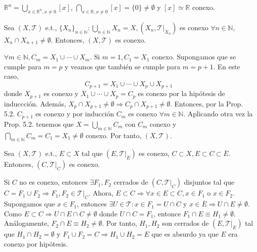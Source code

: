 \begin{ejm}
  $\mathbb{R}^{n} = \bigcup_{x \in \mathbb{R}^{n}, x \neq 0} [x]$, $\bigcap_{x \in \mathbb{R}, x \neq 0} [x] = \{ 0 \} \neq \emptyset$ y $[x] \simeq \mathbb{R}$ conexo.
\end{ejm}

\begin{prop}
  Sea $( X, \mathcal{T} )$ e.t., $\{ X_{n} \}_{n \in \mathbb{N}}: \bigcup_{n \in \mathbb{N}} X_{n} = X, ( X_{n}, \mathcal{T}|_{X_{n}})$ es conexo $\forall n \in \mathbb{N}$, $X_{n} \cap X_{n+1} \neq \emptyset$. Entonces, $ ( X, \mathcal{T} )$ es conexo.
\end{prop}

\begin{dem}
  $\forall m \in \mathbb{N}, C_{m} = X_{1} \cup \cdots  \cup X_{m}$. Si $m = 1, C_{1} = X_{1}$ conexo. Supongamos que se cumple para $m = p$ y veamos que también se cumple para $m = p+1$. En este caso,
  \[ 
    C_{p+1} = X_{1} \cup \cdots \cup X_{p} \cup X_{p+1} 
  \] 
  donde $X_{p+1}$ es conexo y $X_{1} \cup \cdots \cup X_{p} = C_{p}$ es conexo por la hipótesis de induccción. Además, $X_{p} \cap X_{p+1} \neq \emptyset \Rightarrow C_{p} \cap X_{p+1} \neq \emptyset$. Entonces, por la Prop. 5.2. $C_{p+1}$ es conexo y por inducción $C_{m}$ es conexo $\forall m \in \mathbb{N}$. Aplicando otra vez la Prop. 5.2. tenemos que $X = \bigcup_{m \in \mathbb{N}} C_{m}$ con $C_{m}$ conexo y $\bigcap_{m \in \mathbb{N}} C_{m} = C_{1} = X_{1} \neq \emptyset$ conexo. Por tanto, $( X, \mathcal{T} )$. 
\end{dem}

\begin{prop}
  Sea $( X, \mathcal{T} )$ e.t., $E \subset X$ tal que $( E, \mathcal{T}|_{E})$ es conexo, $C \subset X, E \subset C \subset \overline{E}$. Entonces, $( C, \mathcal{T}|_{C})$ es conexo.
\end{prop}

\begin{dem}
  Si $ C$ no es conexo, entonces $\exists F_{1}, F_{2}$ cerrados de $( C, \mathcal{T}|_{C})$ disjuntos tal que $C = F_{1} \cup F_{2} \Rightarrow F_{1}, F_{2} \in \mathcal{T}|_{C}$. Ahora, $E \subset C \Rightarrow \forall x \in E \subset C, x \in F_{1}$ o $x \in F_{2}$. Supongamos que $x \in F_{1}$, entonces $\exists U \in \mathcal{T} : x \in F_{1} = U \cap C$ y $x \in \overline{E} \Rightarrow U \cap E \neq \emptyset$. Como $E \subset C \Rightarrow U \cap E \cap C \neq \emptyset$ donde $ U \cap C = F_{1}$, entonce $F_{1} \cap E \equiv H_{1} \neq \emptyset$. Análogamente, $F_{2} \cap E \equiv H_{2} \neq \emptyset$. Por tanto, $H_{1}, H_{2}$ son cerrados de $( E, \mathcal{T}|_{E})$ tal que $H_{1} \cap H_{2} = \emptyset$ y $F_{1} \cup F_{2} = C \Rightarrow H_{1} \cup H_{2} = E$ que es absurdo ya que $E$ era conexo por hipótesis.
\end{dem}

